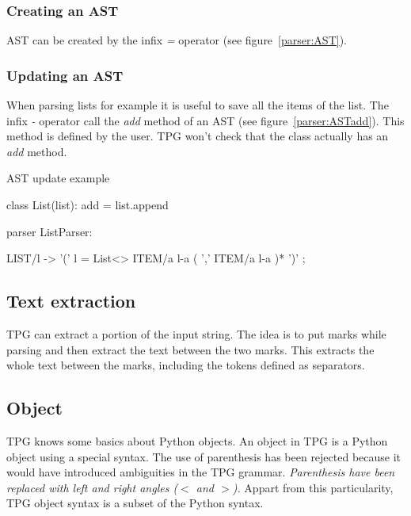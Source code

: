\subsubsection{Creating an AST}

AST can be created by the infix \emph{=} operator (see figure~\ref{parser:AST}).

\subsubsection{Updating an AST}

When parsing lists for example it is useful to save all the items of the list.
The infix \emph{-} operator call the \emph{add} method of an AST (see figure~\ref{parser:ASTadd}).
This method is defined by the user.
TPG won't check that the class actually has an \emph{add} method.

\begin{code}
\caption{AST update example}									\label{parser:ASTadd}
\begin{verbatimtab}[4]
{{
	class List(list):
		add = list.append
}}

parser ListParser:

	LIST/l ->
		'('
			l = List<>
			ITEM/a l-a
			( ',' ITEM/a l-a )*
		')'
		;
\end{verbatimtab}
\end{code}

\subsection{Text extraction}									\label{parser:mark}

TPG can extract a portion of the input string.
The idea is to put marks while parsing and then extract the text between the two marks.
This extracts the whole text between the marks, including the tokens defined as separators.

\subsection{Object}												\label{parser:object}

TPG knows some basics about Python objects.
An object in TPG is a Python object using a special syntax.
The use of parenthesis has been rejected because it would have introduced ambiguities in the TPG grammar.
\emph{Parenthesis have been replaced with left and right angles (\emph{$<$} and \emph{$>$}).}
Appart from this particularity, TPG object syntax is a subset of the Python syntax.

